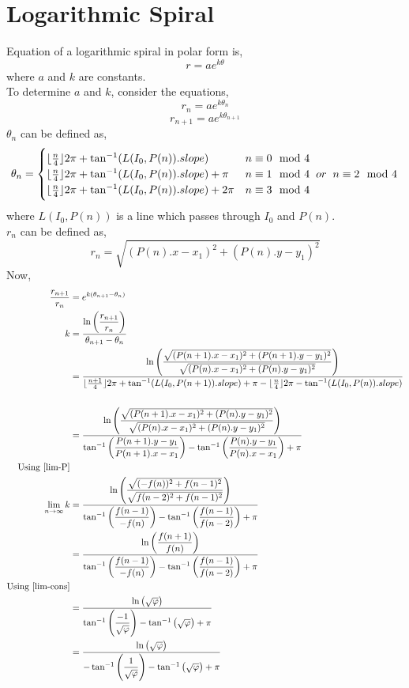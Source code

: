 \documentclass{article}
\begin{document}
\section{Logarithmic Spiral}
Equation of a logarithmic spiral in polar form is,
{\large $$r = ae^{k\theta}$$}
where $a$ and $k$ are constants\cite{LS-wiki}.\\
To determine $a$ and $k$, consider the equations,
{\large$$r_n = ae^{k\theta_n}$$}
{\large$$r_{n+1}=ae^{k\theta_{n+1}}$$}
{\large $\theta_n$} can be defined as,
\begin{equation*}
	 \theta_n = \begin{cases}
		\lfloor\frac{n}{4}\rfloor 2\pi + \tan^{-1}({L(I_0, P(n)).slope}) & n\equiv0\mod4\\
		\lfloor\frac{n}{4}\rfloor 2\pi + \tan^{-1}({L(I_0, P(n)).slope}) + \pi & n\equiv 1 \mod4 \hspace{2mm}or\hspace{2mm} n\equiv 2\mod4\\
		\lfloor\frac{n}{4}\rfloor 2\pi + \tan^{-1}({L(I_0, P(n)).slope}) + 2\pi & n\equiv3\mod4
	\end{cases}
\end{equation*}
where $L(I_0, P(n))$ is a line which passes through $I_0$ and $P(n)$.\\
{\large $r_n$} can be defined as,
$$r_n = \sqrt{(P(n).x -x_1)^2 + (P(n).y - y_1)^2}$$
Now,
\begin{align*}
	 \dfrac{r_{n+1}}{r_n} &= e^{k(\theta_{n+1}-\theta_n)}\\
	 k &= \dfrac{\ln{\left(\dfrac{r_{n+1}}{r_n}\right)}}{\theta_{n+1}-\theta_n}\\
	 &= \dfrac{\ln{\left(\dfrac{\sqrt{(P(n+1).x -x_1)^2 + (P(n+1).y - y_1)^2}}{\sqrt{(P(n).x -x_1)^2 + (P(n).y - y_1)^2}}\right)}}{\lfloor\frac{n+1}{4}\rfloor 2\pi + \tan^{-1}({L(I_0, P(n+1)).slope}) + \pi -\lfloor\frac{n}{4}\rfloor 2\pi - \tan^{-1}({L(I_0, P(n)).slope})}\\\\
	 &= \dfrac{\ln{\left(\dfrac{\sqrt{(P(n+1).x -x_1)^2 + (P(n).y - y_1)^2}}{\sqrt{(P(n).x -x_1)^2 + (P(n).y - y_1)^2}}\right)}}{\tan^{-1}\left({\dfrac{P(n+1).y - y_1}{P(n+1).x - x_1}}\right) - \tan^{-1}\left({\dfrac{P(n).y - y_1}{P(n).x - x_1}}\right)+ \pi}\\
	 \text{Using \ref{lim-P}}\\
	 \lim_{n \to \infty} k&= \dfrac{\ln{\left(\dfrac{\sqrt{(-f(n))^2 + f(n-1)^2}}{\sqrt{f(n-2)^2 + f(n-1)^2}}\right)}}{\tan^{-1}\left({\dfrac{f(n-1)}{-f(n)}}\right) - \tan^{-1}\left({\dfrac{f(n-1)}{f(n-2)}}\right)+ \pi}\\
	 &= \dfrac{\ln{\left(\dfrac{f(n+1)}{f(n)}\right)}}{\tan^{-1}\left({\dfrac{f(n-1)}{-f(n)}}\right) - \tan^{-1}\left({\dfrac{f(n-1)}{f(n-2)}}\right)+ \pi}\\
	 \text{Using \ref{lim-cons}}\\
	 &= \dfrac{\ln{\left(\sqrt{\varphi}\right)}}
	 {\tan^{-1}\left({\dfrac{-1}{\sqrt{\varphi}}}\right) - \tan^{-1}\left({\sqrt{\varphi}}\right)+ \pi}\\
	 &= \dfrac{\ln{\left(\sqrt{\varphi}\right)}}
	 {-\tan^{-1}\left({\dfrac{1}{\sqrt{\varphi}}}\right) - \tan^{-1}\left({\sqrt{\varphi}}\right)+ \pi}
\end{align*}
\end{document}
